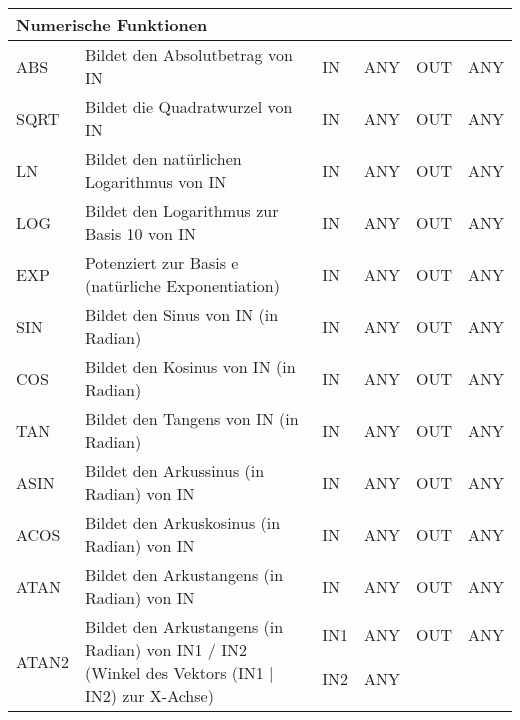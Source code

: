 {\begin{table}
\begin{tabular}{|m{2cm}|m{7cm}|>{\raggedright}m{0.75cm} >{\raggedleft}m{1cm}|>{\raggedright}m{0.75cm} >{\raggedleft\arraybackslash}m{1cm}|}
\multicolumn{6}{|l|}{\textbf{Numerische Funktionen}}\\
\hline
ABS & Bildet den Absolutbetrag von IN & IN & ANY & OUT & ANY\\
\hline
SQRT & Bildet die Quadratwurzel von IN & IN & ANY & OUT & ANY\\
\hline
LN & Bildet den natürlichen Logarithmus von IN & IN & ANY & OUT & ANY\\
\hline
LOG & Bildet den Logarithmus zur Basis 10 von IN & IN & ANY & OUT & ANY\\
\hline
EXP & Potenziert zur Basis e (natürliche Exponentiation) & IN & ANY & OUT & ANY\\
\hline
SIN & Bildet den Sinus von IN (in Radian) & IN & ANY & OUT & ANY\\
\hline
COS & Bildet den Kosinus von IN (in Radian) & IN & ANY & OUT & ANY\\
\hline
TAN & Bildet den Tangens von IN (in Radian) & IN & ANY & OUT & ANY\\
\hline
ASIN & Bildet den Arkussinus (in Radian) von IN & IN & ANY & OUT & ANY\\
\hline
ACOS & Bildet den Arkuskosinus (in Radian) von IN & IN & ANY & OUT & ANY\\
\hline
ATAN & Bildet den Arkustangens (in Radian) von IN & IN & ANY & OUT & ANY\\
\hline
\multirow{3}{*}{ATAN2}&\multirow{3}{7cm}{Bildet den Arkustangens (in Radian) von IN1 / IN2 (Winkel des Vektors (IN1 | IN2) zur X-Achse)}& IN1 & ANY& OUT & ANY\\
 & &IN2 & ANY& &\\
 & & & & &\\
\hline
\end{tabular}
\renewcommand{\arraystretch}{1}
\end{table}

}
